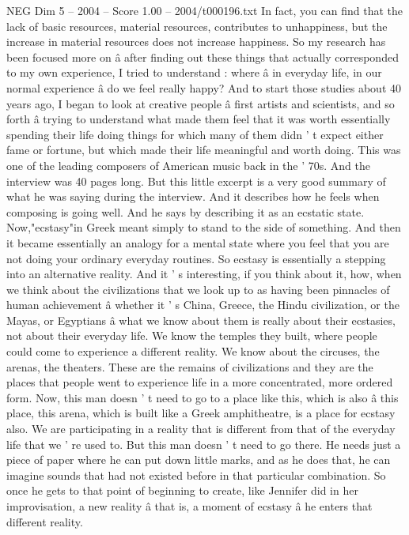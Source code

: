 \begin{textsample}{NEG Dim 5 – 2004 – Score 1.00 – 2004/t000196.txt}
In fact, you can find that the lack of basic resources, material resources, contributes to unhappiness, but the increase in material resources does not increase happiness.
So my research has been focused more on â after finding out these things that actually corresponded to my own experience, I tried to understand : where â in everyday life, in our normal experience â do we feel really happy?
And to start those studies about 40 years ago, I began to look at creative people â first artists and scientists, and so forth â trying to understand what made them feel that it was worth essentially spending their life doing things for which many of them didn ' t expect either fame or fortune, but which made their life meaningful and worth doing.
This was one of the leading composers of American music back in the ' 70s.
And the interview was 40 pages long.
But this little excerpt is a very good summary of what he was saying during the interview.
And it describes how he feels when composing is going well.
And he says by describing it as an ecstatic state.
Now,"ecstasy"in Greek meant simply to stand to the side of something.
And then it became essentially an analogy for a mental state where you feel that you are not doing your ordinary everyday routines.
So ecstasy is essentially a stepping into an alternative reality.
And it ' s interesting, if you think about it, how, when we think about the civilizations that we look up to as having been pinnacles of human achievement â whether it ' s China, Greece, the Hindu civilization, or the Mayas, or Egyptians â what we know about them is really about their ecstasies, not about their everyday life.
We know the temples they built, where people could come to experience a different reality.
We know about the circuses, the arenas, the theaters.
These are the remains of civilizations and they are the places that people went to experience life in a more concentrated, more ordered form.
Now, this man doesn ' t need to go to a place like this, which is also â this place, this arena, which is built like a Greek amphitheatre, is a place for ecstasy also.
We are participating in a reality that is different from that of the everyday life that we ' re used to.
But this man doesn ' t need to go there.
He needs just a piece of paper where he can put down little marks, and as he does that, he can imagine sounds that had not existed before in that particular combination.
So once he gets to that point of beginning to create, like Jennifer did in her improvisation, a new reality â that is, a moment of ecstasy â he enters that different reality.

\end{textsample}
